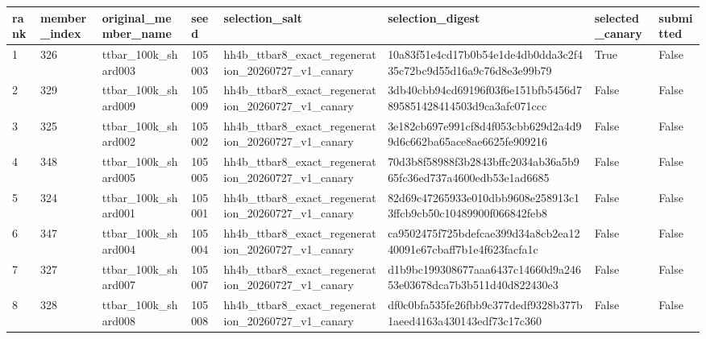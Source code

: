 \begin{tabular}{llllllll}
\toprule
rank & member\_index & original\_member\_name & seed & selection\_salt & selection\_digest & selected\_canary & submitted \\
\midrule
1 & 326 & ttbar\_100k\_shard003 & 105003 & hh4b\_ttbar8\_exact\_regeneration\_20260727\_v1\_canary & 10a83f51e4cd17b0b54e1de4db0dda3c2f435c72bc9d55d16a9c76d8e3e99b79 & True & False \\
2 & 329 & ttbar\_100k\_shard009 & 105009 & hh4b\_ttbar8\_exact\_regeneration\_20260727\_v1\_canary & 3db40cbb94cd69196f03f6e151bfb5456d7895851428414503d9ca3afc071ccc & False & False \\
3 & 325 & ttbar\_100k\_shard002 & 105002 & hh4b\_ttbar8\_exact\_regeneration\_20260727\_v1\_canary & 3e182cb697e991cf8d4f053cbb629d2a4d99d6c662ba65ace8ae6625fe909216 & False & False \\
4 & 348 & ttbar\_100k\_shard005 & 105005 & hh4b\_ttbar8\_exact\_regeneration\_20260727\_v1\_canary & 70d3b8f58988f3b2843bffc2034ab36a5b965fc36ed737a4600edb53e1ad6685 & False & False \\
5 & 324 & ttbar\_100k\_shard001 & 105001 & hh4b\_ttbar8\_exact\_regeneration\_20260727\_v1\_canary & 82d69c47265933e010dbb9608e258913c13ffcb9cb50c10489900f066842feb8 & False & False \\
6 & 347 & ttbar\_100k\_shard004 & 105004 & hh4b\_ttbar8\_exact\_regeneration\_20260727\_v1\_canary & ca9502475f725bdefcae399d34a8cb2ea1240091e67cbaff7b1e4f623facfa1c & False & False \\
7 & 327 & ttbar\_100k\_shard007 & 105007 & hh4b\_ttbar8\_exact\_regeneration\_20260727\_v1\_canary & d1b9bc199308677aaa6437c14660d9a24653e03678dca7b3b511d40d822430e3 & False & False \\
8 & 328 & ttbar\_100k\_shard008 & 105008 & hh4b\_ttbar8\_exact\_regeneration\_20260727\_v1\_canary & df0c0bfa535fe26fbb9c377dedf9328b377b1aeed4163a430143edf73c17c360 & False & False \\
\bottomrule
\end{tabular}
